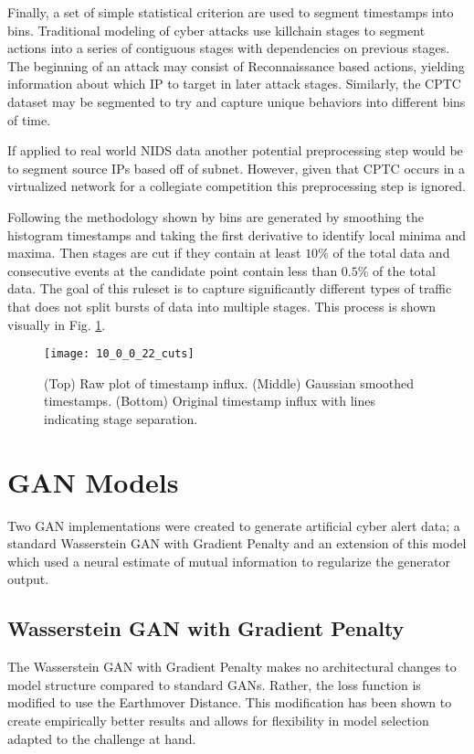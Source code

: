 

Finally, a set of simple statistical criterion are used to segment timestamps into bins. Traditional modeling of cyber attacks use killchain stages to segment actions into a series of contiguous stages with dependencies on previous stages. The beginning of an attack may consist of Reconnaissance based actions, yielding information about which IP to target in later attack stages. Similarly, the CPTC dataset may be segmented to try and capture unique behaviors into different bins of time. 

If applied to real world NIDS data another potential preprocessing step would be to segment source IPs based off of subnet. However, given that CPTC occurs in a virtualized network for a collegiate competition this preprocessing step is ignored. 

Following the methodology shown by \cite{us} bins are generated by smoothing the histogram timestamps and taking the first derivative to identify local minima and maxima. Then stages are cut if they contain at least $10\%$ of the total data and consecutive events at the candidate point contain less than $0.5\%$ of the total data. The goal of this ruleset is to capture significantly different types of traffic that does not split bursts of data into multiple stages. This process is shown visually in Fig. \ref{fig:cut_process}.

\begin{figure}[!htbp]
	\centering%
	\texttt{[image: 10\_0\_0\_22\_cuts]}
	\caption{
		(Top) Raw plot of timestamp influx.
		(Middle) Gaussian smoothed timestamps.
		(Bottom) Original timestamp influx with lines indicating stage separation. 
	}
	\label{fig:cut_process}
\end{figure}

\section{GAN Models}
\label{sec:model_arch}
Two GAN implementations were created to generate artificial cyber alert data; a standard Wasserstein GAN with Gradient Penalty and an extension of this model which used a neural estimate of mutual information to regularize the generator output.  

\subsection{Wasserstein GAN with Gradient Penalty}
\label{sec:gan}
The Wasserstein GAN with Gradient Penalty makes no architectural changes to model structure compared to standard GANs. Rather, the loss function is modified to use the Earthmover Distance. This modification has been shown to create empirically better results and allows for flexibility in model selection adapted to the challenge at hand.

